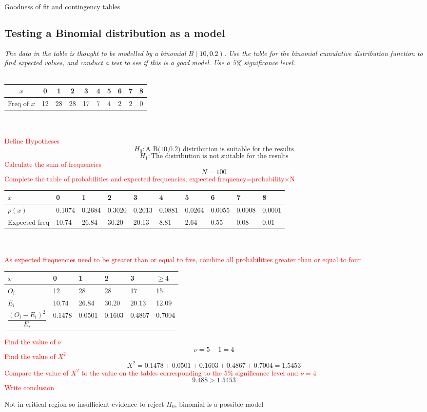 \documentclass{article}[18pt]
\begin{document}
\begin{center}
\underline{\huge Goodness of fit and contingency tables}
\end{center}
\subsection{Testing a Binomial distribution as a model}
\textit{The data in the table is thought to be modelled by a binomial $B(10,0.2)$. Use the table for the binomial cumulative distribution function to find expected values, and conduct a test to see if this is a good model. Use a 5\% significance level.}\\
\\
\begin{tabular}{|c|c|c|c|c|c|c|c|c|c|}
\hline
$x$&0&1&2&3&4&5&6&7&8\\
\hline
Freq of $x$&12&28&28&17&7&4&2&2&0\\
\hline
\end{tabular}
\\
\\
\textcolor{red}{Define Hypotheses}
$$H_0: \textrm{A B(10,0.2) distribution is suitable for the results}$$
$$H_1: \textrm{The distribution is not suitable for the results}$$
\textcolor{red}{Calculate the sum of frequencies}
$$N=100$$
\textcolor{red}{Complete the table of probabilities and expected frequencies, expected frequency=probability$\times$N}\\
\begin{tabularx}{\textwidth}{|X|X|X|X|X|X|X|X|X|X|}
\hline
$x$&0&1&2&3&4&5&6&7&8\\
\hline
$p(x)$&0.1074&0.2684&0.3020&0.2013&0.0881&0.0264&0.0055&0.0008&0.0001\\
\hline
Expected freq&10.74&26.84&30.20&20.13&8.81&2.64&0.55&0.08&0.01\\
\hline
\end{tabularx}
\\
\\
\textcolor{red}{As expected frequencies need to be greater than or equal to five, combine all probabilities greater than or equal to four}
\\
\begin{tabularx}{\textwidth}{|X|X|X|X|X|X|}
\hline
$x$&0&1&2&3&$\geqslant4$\\
\hline
$O_i$&12&28&28&17&15\\
\hline
$E_i$&10.74&26.84&30.20&20.13&12.09\\
\hline
$\dfrac{(O_i-E_i)^2}{E_i}$&0.1478&0.0501&0.1603&0.4867&0.7004\\
\hline
\end{tabularx}
\textcolor{red}{Find the value of $\nu$}
$$\nu=5-1=4$$
\textcolor{red}{Find the value of $X^2$}
$$X^2=0.1478+0.0501+0.1603+0.4867+0.7004=1.5453$$
\textcolor{red}{Compare the value of $X^2$ to the value on the tables corresponding to the 5\% significance level and $\nu=4$}
$$9.488>1.5453$$
\textcolor{red}{Write conclusion}
\begin{center}
Not in critical region so insufficient evidence to reject $H_0$, binomial is a possible model
\end{center}
\newpage
\end{document}
